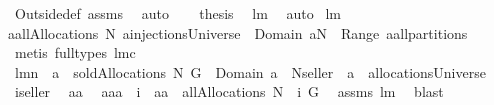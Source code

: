 \begin{isabellebody}
\ Outside{\isacharunderscore}def\ assms{\isacharparenleft}{}{\isacharparenright}\ \isamarkupfalse%
\ auto\ \isanewline
{}\isamarkupfalse%
\ \isamarkupfalse%
\ {\isacharquery}thesis\ \isamarkupfalse%
\ lm{}{}\ \isamarkupfalse%
\ auto\isanewline
{}\isamarkupfalse%
%
\endisatagproof
{\isafoldproof}%
%
\isadelimproof
%
\endisadelimproof
\isanewline
\isanewline
{}\isamarkupfalse%
\ lm{}{}{\isacharcolon}\ \isanewline
{\isachardoublequoteopen}a{\isasymin}allAllocations\ N\ {\isasymOmega}{\isacharequal}{\isacharparenleft}a{\isasymin}injectionsUniverse\ {\isacharampersand}\ Domain\ a{\isasymsubseteq}N\ {\isacharampersand}\ Range\ a{\isasymin}all{\isacharunderscore}partitions\ {\isasymOmega}{\isacharparenright}{\isachardoublequoteclose}\ \isanewline
%
\isadelimproof
%
\endisadelimproof
%
\isatagproof
{}\isamarkupfalse%
\ {\isacharparenleft}metis\ {\isacharparenleft}full{\isacharunderscore}types{\isacharparenright}\ lm{}{}c{\isacharparenright}%
\endisatagproof
{\isafoldproof}%
%
\isadelimproof
\isanewline
%
\endisadelimproof
\isanewline
{}\isamarkupfalse%
\ lm{}{}n{\isacharcolon}\ \ {\isachardoublequoteopen}a\ {\isasymin}\ soldAllocations{\isacharprime}{\isacharprime}\ N\ G{\isachardoublequoteclose}\ \ {\isachardoublequoteopen}Domain\ a\ {\isasymsubseteq}\ N{\isacharminus}{\isacharbraceleft}seller{\isacharbraceright}\ {\isacharampersand}\ a\ {\isasymin}\ allocationsUniverse{\isachardoublequoteclose}\ \ \isanewline
%
\isadelimproof
%
\endisadelimproof
%
\isatagproof
{}\isamarkupfalse%
\ {\isacharminus}\isanewline
{}\isamarkupfalse%
\ {\isacharquery}i{\isacharequal}{\isachardoublequoteopen}seller{\isachardoublequoteclose}\ \isamarkupfalse%
\ aa\ \isanewline
{}{\isacharcolon}\ {\isachardoublequoteopen}a{\isacharequal}aa\ {\isacharminus}{\isacharminus}\ {\isacharquery}i\ {\isacharampersand}\ aa\ {\isasymin}\ allAllocations{\isacharprime}{\isacharprime}\ {\isacharparenleft}N\ {\isasymunion}\ {\isacharbraceleft}{\isacharquery}i{\isacharbraceright}{\isacharparenright}\ G{\isachardoublequoteclose}\ \isamarkupfalse%
\ assms{\isacharparenleft}{}{\isacharparenright}\ lm{}{}\ \isamarkupfalse%
\ blast\isanewline
{}\isamarkupfalse%
\ \isamarkupfalse%

\end{isabellebody}
